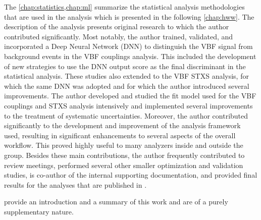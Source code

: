 The \cref{chap:statistics,chap:ml} summarize the statistical analysis methodologies that are used in the \HWW analysis which is presented in the following \cref{chap:hww}. The description of the \HWW analysis presents original research to which the author contributed significantly. Most notably, the author trained, validated, and incorporated a Deep Neural Network (DNN) to distinguish the VBF signal from background events in the VBF couplings analysis. This included the development of new strategies to use the DNN output score as the final discriminant in the statistical analysis. These studies also extended to the VBF STXS analysis, for which the same DNN was adopted and for which the author introduced several improvements.
The author developed and studied the fit model used for the VBF couplings and STXS analysis intensively and implemented several improvements to the treatment of systematic uncertainties.
Moreover, the author contributed significantly to the development and improvement of the analysis framework used, resulting in significant enhancements to several aspects of the overall workflow. This proved highly useful to many analyzers inside and outside the \HWW group.
Besides these main contributions, the author frequently contributed to review meetings, performed several other smaller optimization and validation studies, is co-author of the internal supporting documentation, and provided final results for the analyses that are published in .

 provide an introduction and a summary of this work and are of a purely supplementary nature.


